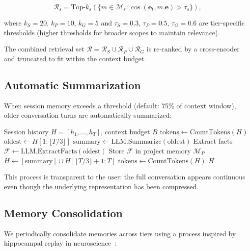 \documentclass[11pt,twocolumn]{article}
\begin{document}
\begin{equation}
\mathcal{R}_s = \text{Top-}k_s\left(\{m \in \mathcal{M}_s : \cos(\bm{e}_t, m.\bm{e}) > \tau_s\}\right),
\end{equation}

where $k_S = 20$, $k_P = 10$, $k_G = 5$ and $\tau_S = 0.3$, $\tau_P = 0.5$, $\tau_G = 0.6$ are tier-specific thresholds (higher thresholds for broader scopes to maintain relevance).

The combined retrieval set $\mathcal{R} = \mathcal{R}_S \cup \mathcal{R}_P \cup \mathcal{R}_G$ is re-ranked by a cross-encoder~\cite{nogueira2019passage} and truncated to fit within the context budget.

\subsection{Automatic Summarization}

When session memory exceeds a threshold (default: 75\% of context window), older conversation turns are automatically summarized:

\begin{algorithm}[H]
\caption{Adaptive Memory Summarization}
\label{alg:summarize}
\begin{algorithmic}[1]
\Require Session history $H = [h_1, \ldots, h_T]$, context budget $B$
\State $\text{tokens} \gets \text{CountTokens}(H)$
    \State $\text{oldest} \gets H[1:\lfloor T/3 \rfloor]$ 
    \State $\text{summary} \gets \text{LLM.Summarize}(\text{oldest})$
    \State Extract facts $\mathcal{F} \gets \text{LLM.ExtractFacts}(\text{oldest})$
    \State Store $\mathcal{F}$ in project memory $\mathcal{M}_P$
    \State $H \gets [\text{summary}] \cup H[\lfloor T/3 \rfloor + 1 : T]$
    \State $\text{tokens} \gets \text{CountTokens}(H)$
\EndWhile
\State \Return $H$
\end{algorithmic}
\end{algorithm}

This process is transparent to the user: the full conversation appears continuous even though the underlying representation has been compressed.

\subsection{Memory Consolidation}

We periodically consolidate memories across tiers using a process inspired by hippocampal replay in neuroscience~\cite{mcclelland1995memory}:
\end{document}
